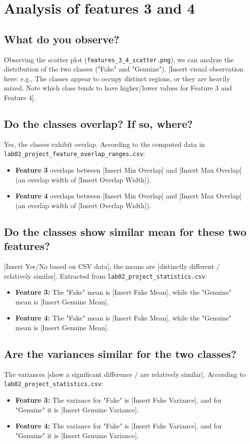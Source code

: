 \section*{Analysis of features 3 and 4}

\subsection*{What do you observe?}
Observing the scatter plot (\texttt{features\_3\_4\_scatter.png}), we can analyze the distribution of the two classes ("Fake" and "Genuine"). [Insert visual observation here: e.g., The classes appear to occupy distinct regions, or they are heavily mixed. Note which class tends to have higher/lower values for Feature 3 and Feature 4].

\subsection*{Do the classes overlap? If so, where?}
Yes, the classes exhibit overlap. According to the computed data in \texttt{lab02\_project\_feature\_overlap\_ranges.csv}:
\begin{itemize}
    \item \textbf{Feature 3} overlaps between [Insert Min Overlap] and [Insert Max Overlap] (an overlap width of [Insert Overlap Width]).
    \item \textbf{Feature 4} overlaps between [Insert Min Overlap] and [Insert Max Overlap] (an overlap width of [Insert Overlap Width]).
\end{itemize}

\subsection*{Do the classes show similar mean for these two features?}
[Insert Yes/No based on CSV data], the means are [distinctly different / relatively similar]. Extracted from \texttt{lab02\_project\_statistics.csv}:
\begin{itemize}
    \item \textbf{Feature 3:} The "Fake" mean is [Insert Fake Mean], while the "Genuine" mean is [Insert Genuine Mean].
    \item \textbf{Feature 4:} The "Fake" mean is [Insert Fake Mean], while the "Genuine" mean is [Insert Genuine Mean].
\end{itemize}

\subsection*{Are the variances similar for the two classes?}
The variances [show a significant difference / are relatively similar]. According to \texttt{lab02\_project\_statistics.csv}:
\begin{itemize}
    \item \textbf{Feature 3:} The variance for "Fake" is [Insert Fake Variance], and for "Genuine" it is [Insert Genuine Variance].
    \item \textbf{Feature 4:} The variance for "Fake" is [Insert Fake Variance], and for "Genuine" it is [Insert Genuine Variance].
\end{itemize}

